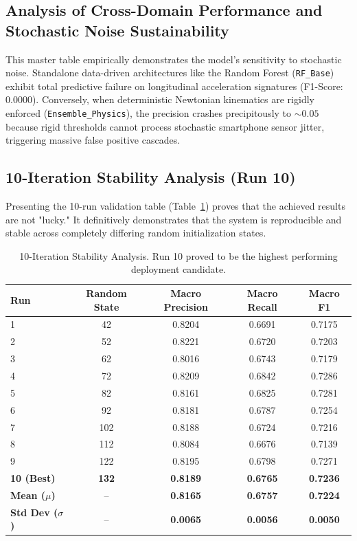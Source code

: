 \documentclass[pdflatex,sn-mathphys-num]{sn-jnl}
\theoremstyle{thmstyleone}
\theoremstyle{thmstyletwo}
\theoremstyle{thmstylethree}
\begin{document}
\subsection{Analysis of Cross-Domain Performance and Stochastic Noise Sustainability}
This master table empirically demonstrates the model's sensitivity to stochastic noise. Standalone data-driven architectures like the Random Forest (\texttt{RF\_Base}) exhibit total predictive failure on longitudinal acceleration signatures (F1-Score: $0.0000$). Conversely, when deterministic Newtonian kinematics are rigidly enforced (\texttt{Ensemble\_Physics}), the precision crashes precipitously to $\sim0.05$ because rigid thresholds cannot process stochastic smartphone sensor jitter, triggering massive false positive cascades. 

\FloatBarrier
\subsection{10-Iteration Stability Analysis (Run 10)}
Presenting the 10-run validation table (Table~\ref{tab:10run_stability}) proves that the achieved results are not "lucky." It definitively demonstrates that the system is reproducible and stable across completely differing random initialization states.

\begin{table}[!ht]
\centering
\caption{10-Iteration Stability Analysis. Run 10 proved to be the highest performing deployment candidate.}
\label{tab:10run_stability}
\begin{tabular}{lcccc}
\toprule
\textbf{Run} & \textbf{Random State} & \textbf{Macro Precision} & \textbf{Macro Recall} & \textbf{Macro F1} \\
\midrule
1 & 42  & 0.8204 & 0.6691 & 0.7175 \\
2 & 52  & 0.8221 & 0.6720 & 0.7203 \\
3 & 62  & 0.8016 & 0.6743 & 0.7179 \\
4 & 72  & 0.8209 & 0.6842 & 0.7286 \\
5 & 82  & 0.8161 & 0.6825 & 0.7281 \\
6 & 92  & 0.8181 & 0.6787 & 0.7254 \\
7 & 102 & 0.8188 & 0.6724 & 0.7216 \\
8 & 112 & 0.8084 & 0.6676 & 0.7139 \\
9 & 122 & 0.8195 & 0.6798 & 0.7271 \\
\textbf{10 (Best)} & \textbf{132} & \textbf{0.8189} & \textbf{0.6765} & \textbf{0.7236} \\
\midrule
\textbf{Mean ($\mu$)} & -- & \textbf{0.8165} & \textbf{0.6757} & \textbf{0.7224} \\
\textbf{Std Dev ($\sigma$)}& -- & \textbf{0.0065} & \textbf{0.0056} & \textbf{0.0050} \\
\bottomrule
\end{tabular}
\end{table}
\end{document}

